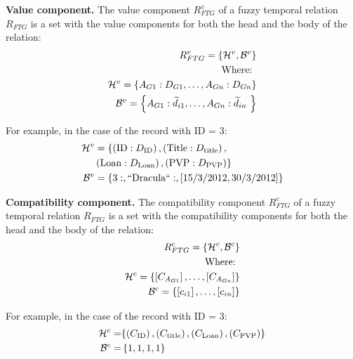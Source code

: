 \begin{definition}
\label{def:value-component}
\textbf{Value component.}
The value component $R^{v}_{FTG}$ of a fuzzy temporal relation $R_{FTG}$ is a set with the value components for both the head and the body of the relation:
\begin{align}
\label{eq:value-component}
R^{v}_{FTG} = \left \lbrace \mathcal{H}^{v},\mathcal{B}^{v} \right \rbrace \\
\nonumber
\text{Where: } \\
\nonumber
\mathcal{H}^{v} = \left \lbrace A_{G1}:D_{G1}, \ldots,  A_{Gn}:D_{Gn} \right \rbrace \\
\nonumber
\mathcal{B}^ {v} = \left \lbrace A_{G1}:\widetilde{d}_{i1}, \ldots,  A_{Gn}:\widetilde{d}_{in}\ \right \rbrace 
\end{align}
\end{definition}

For example, in the case of the record with ID = 3:
\begin{align}
\nonumber
\mathcal{H}^{v} &=  \lbrace \left(\text{ID}:D_{\text{ID}}\right), \left(\text{Title}:D_{\text{title}}\right),\\
\nonumber
& \left(\text{Loan}:D_{\text{Loan}}\right), \left(\text{PVP}:D_{\text{PVP}}\right) \rbrace \\
\nonumber
\mathcal{B}^ {v} &= \left \lbrace 3:, \text{``Dracula``}: ,  \left[15/3/2012, 30/3/2012\right] \right \rbrace 
\end{align}


\begin{definition}
\label{def:compatibility-component}
\textbf{Compatibility component.}
The compatibility component $R^{c}_{FTG}$ of a fuzzy temporal relation $R_{FTG}$ is a set with the compatibility components for both the head and the body of the relation:
\begin{align}
\label{eq:compatibility-component}
R^{c}_{FTG} = \left \lbrace \mathcal{H}^{c},\mathcal{B}^{c} \right \rbrace \\
\nonumber
\text{Where: } \\
\nonumber
\mathcal{H}^{c} = \left \lbrace \left[C_{A_{G1}} \right], \ldots,  \left[C_{A_{Gn}} \right] \right \rbrace \\
\nonumber
\mathcal{B}^ {c} = \left \lbrace \left[ c_{i1} \right], \ldots, \left[ c_{in} \right] \right \rbrace 
\end{align}
\end{definition}

For example, in the case of the record with ID = 3:
\begin{align}
\nonumber
\mathcal{H}^{c} = & \lbrace \left(C_\text{ID}\right), \left(C_{\text{title}}\right), \left(C_{\text{Loan}}\right), \left(C_{\text{PVP}}\right) \rbrace \\
\nonumber
\mathcal{B}^ {c} = &\left \lbrace 1, 1, 1, 1 \right \rbrace 
\end{align}


